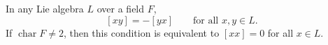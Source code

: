 In any Lie algebra $L$ over a field $F$,
$$[xy] = -[yx] \qquad \text{for all } x, y \in L.$$
If $\operatorname{char} F \neq 2$, then this condition is equivalent to $[xx] = 0$ for all $x \in L$.
